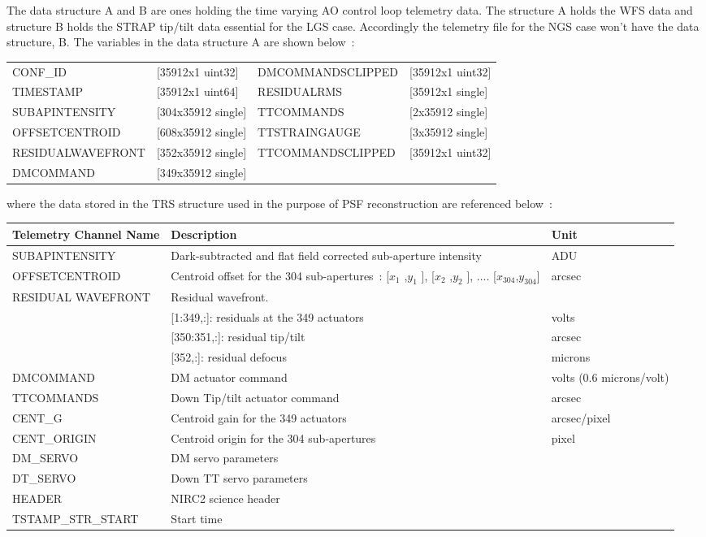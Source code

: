 \documentclass[12pt]{article}
\begin{document}
The  data  structure  A  and  B  are  ones  holding  the  time  varying  AO  control  loop  telemetry  data.  The 
structure A holds the WFS data and structure B holds the STRAP tip/tilt data essential for the LGS case. 
Accordingly  the  telemetry  file  for  the  NGS  case  won’t  have  the  data  structure,  B.  The  variables  in  the 
data structure A are shown below~: 
\begin{table} [H]
	\begin{tabular}{llll}
 CONF\_ID 			& [35912x1 uint32] 		& DMCOMMANDSCLIPPED 	& [35912x1 uint32]\\
TIMESTAMP 			& [35912x1 uint64]		& RESIDUALRMS 			& [35912x1 single]\\
SUBAPINTENSITY		& [304x35912 single]	& TTCOMMANDS 			& [2x35912 single]\\
OFFSETCENTROID 		& [608x35912 single] 	& TTSTRAINGAUGE 		& [3x35912 single]\\
RESIDUALWAVEFRONT 	&[352x35912 single] 	& TTCOMMANDSCLIPPED 	& [35912x1 uint32]\\
DMCOMMAND 			&[349x35912 single] 	& 						&
\end{tabular}	
\end{table}

where the data stored in the TRS structure used in the purpose of PSF reconstruction are referenced below~:
\begin{table}[H]
	\centering
\begin{tabular}{|p{5cm}|p{7cm}|p{4cm}|}
	\hline
	\textbf{Telemetry Channel Name} & \textbf{Description} & \textbf{Unit} \\
	\hline
	SUBAPINTENSITY & Dark-subtracted  and  flat  field  corrected sub-aperture intensity & ADU \\
	\hline
	OFFSETCENTROID & Centroid  offset  for  the  304  sub-apertures~:  [$x_1$ ,$y_1$ ],  [$x_2$ ,$y_2$ ],  .... 
	[$x_{304}$,$y_{304}$] & arcsec\\
	\hline	
	\multirow{4}{3cm}{RESIDUAL WAVEFRONT} & Residual wavefront.&\\
	& [1:349,:]:  residuals  at  the  349  actuators & volts\\
 &	[350:351,:]: residual tip/tilt & arcsec\\
&	[352,:]: residual defocus \hfill & microns\\
	 \hline
	DMCOMMAND & DM actuator command  &volts (0.6 microns/volt)\\
	\hline
	TTCOMMANDS & Down Tip/tilt actuator command  & arcsec \\
	\hline 	
	CENT\_G  & Centroid  gain  for  the  349 actuators & arcsec/pixel\\
	\hline 
	CENT\_ORIGIN  &  Centroid  origin  for  the  304 sub‐apertures & pixel\\ 
	\hline 
	DM\_SERVO & DM servo parameters & \\	
	\hline 
	DT\_SERVO & Down TT servo parameters & \\		
	\hline 
	HEADER  & NIRC2 science header & \\	
	\hline 
	TSTAMP\_STR\_START & Start time &\\
	\hline 
\end{tabular}
\end{table}
\end{document}
